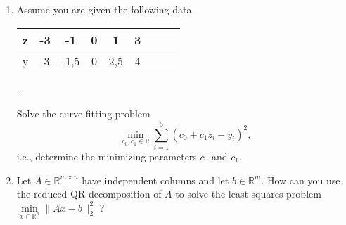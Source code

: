 \vspace*{-0.5cm}
\begin{enumerate}
	\item Assume you are given the following data
	\begin{center}
	\begin{tabular}{|l|c|c|c|c|c|c||c|c|}\hline
		z&-3&-1&0&1&3\\ 
		\hline
		y&-3&-1,5&0&2,5&4\\
		\hline
	\end{tabular}.
\end{center}
	Solve the curve fitting problem
	$$
	\min\limits_{c_0, c_1 \in \mathbb{R}} \sum_{i=1}^5 (c_0 + c_1z_i - y_i)^2,
	$$
	i.e., determine the minimizing parameters $c_0$ and $c_1$.
	\item Let  $A \in \mathbb{R}^{m \times n}$ have independent columns and let $b \in \mathbb{R}^{m}$. How can you use the reduced QR-decomposition of $A$ to solve the least squares problem $
\min\limits_{x \in \mathbb{R}^n } \| Ax - b \|_2^2
$ ?
\end{enumerate}

 